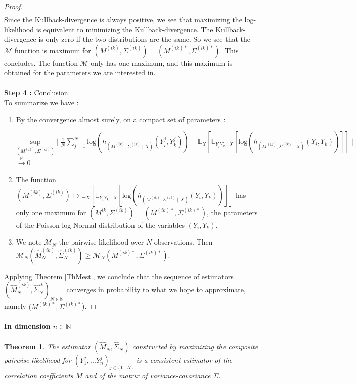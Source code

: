 \documentclass[11pt, a4paper]{article}
\newtheorem{theorem}{Theorem}
\begin{document}
\begin{proof}
\begin{align*}
\end{align*}
 Since the Kullback-divergence is always positive, we see that maximizing the log-likelihood is equivalent to minimizing the Kullback-divergence. The Kullback-divergence is only zero if the two distributions are the same. So we see that the $\mathcal{M}$ function is maximum for $(M^{(ik)},\Sigma^{(ik)})=(M^{(ik)\ast},\Sigma^{(ik)\ast})$. This concludes. The function $\mathcal{M}$ only has one maximum, and this maximum is obtained for the parameters we are interested in.\\
\\
\textbf{Step 4 :} Conclusion.\\
To summarize we have :
\begin{enumerate}
\item By the convergence almost surely, on a compact set of parameters :
\begin{center}
 $\underset{(M^{(ik)},\Sigma^{(ik)})}{\mathrm{sup}} \mid \frac{1}{N} \sum_{j=1}^{N} \mathrm{log}(h_{(M^{(ik)},\Sigma^{(ik)} \mid X)}(Y^j_i,Y^j_k)) - \mathbb{E}_X[\mathbb{E}_{Y_i Y_k \mid X}[\mathrm{log}(h_{(M^{(ik)},\Sigma^{(ik)} \mid X)}(Y_i,Y_k))]] \mid$\\ $\overset{\mathbb{P}}{\longrightarrow} 0 $ 
 \end{center}
\item The function $(M^{(ik)},\Sigma^{(ik)})\mapsto \mathbb{E}_X[\mathbb{E}_{Y_i Y_k \mid X}[\mathrm{log}(h_{(M^{(ik)},\Sigma^{(ik)} \mid X)}(Y_i,Y_k))]] $ has only one maximum for $(M^{ik},\Sigma^{(ik)})=(M^{(ik)\ast},\Sigma^{(ik)\ast})$, the parameters of the Poisson log-Normal distribution of the variables $(Y_i,Y_k)$.
\item We note $\mathcal{M}_N$ the pairwise likelihood over $N$ observations. Then $\mathcal{M}_N(\widehat{M}^{(ik)}_N,\widehat{\Sigma}^{(ik)}_N) \geq \mathcal{M}_N(M^{(ik)\ast},\Sigma^{(ik)\ast}) $.
\end{enumerate}
Applying Theorem \ref{ThMest}, we conclude that the sequence of estimators $(\widehat{M}^{(ik)}_N, \widehat{\Sigma}^{ik}_N)_{N \in \mathbb{N}}$ converges in probability to what we hope to approximate, namely $(M^{(ik)\ast}, \Sigma^{(ik)\ast}$).
\end{proof}

\paragraph{In dimension $n \in \mathbb{N}$}
\begin{theorem}
The estimator $(\widehat{M}_N,\widehat{\Sigma}_N)$ constructed by maximizing the composite pairwise likelihood for $(Y^j_1,...Y^j_n)_{j \in \{1...N\}}$ is a consistent estimator of the correlation coefficients $M$ and of the matrix of variance-covariance $\Sigma$.
\end{theorem}
\end{document}
